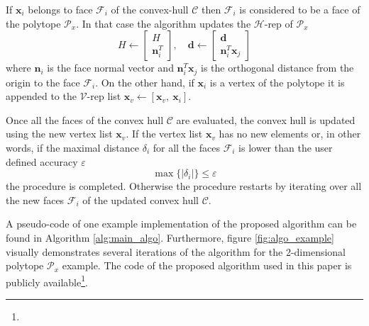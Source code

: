 If $\bm{x}_i$ belongs to face $\mathcal{F}_i$ of the convex-hull $\mathcal{C}$ then  $\mathcal{F}_i$ is considered to be a face of the polytope $\mathcal{P}_x$. In that case the algorithm updates the $\mathcal{H}$-rep of $\mathcal{P}_x$ 
\begin{equation}
    H \leftarrow \begin{bmatrix} H \\ \bm{n}_i^T\end{bmatrix}, \quad \bm{d} \leftarrow \begin{bmatrix}  \bm{d} \\ \bm{n}^T_i \bm{x}_{j} \end{bmatrix}
\label{eq:h_rep}
\end{equation}
where $\bm{n}_i$ is the face normal vector and $\bm{n}_i^T \bm{x}_{j}$ is the orthogonal distance from the origin to the face $\mathcal{F}_i$. On the other hand, if $\bm{x}_i$ is a vertex of the polytope it is appended to the $\mathcal{V}$-rep list $\bm{x}_v \leftarrow [\bm{x}_v, ~\bm{x}_i]$.

Once all the faces of the convex hull $\mathcal{C}$ are evaluated, the convex hull is updated using the new vertex list $\bm{x}_v$.
If the vertex list $\bm{x}_v$ has no new elements or, in other words, if the maximal distance $\delta_i$ for all the faces $\mathcal{F}_i$ is lower than the user defined accuracy $\varepsilon$  
\begin{equation}
    \max\{|\delta_{i}|\} \leq \varepsilon
\end{equation}
the procedure is completed. Otherwise the procedure restarts by iterating over all the new faces $\mathcal{F}_i$ of the updated convex hull $\mathcal{C}$. 

A pseudo-code of one example implementation of the proposed algorithm can be found in Algorithm \ref{alg:main_algo}. Furthermore, figure \ref{fig:algo_example} visually demonstrates several iterations of the algorithm for the 2-dimensional polytope $\mathcal{P}_x$ example. The code of the proposed algorithm used in this paper is publicly available\footnote{}.

